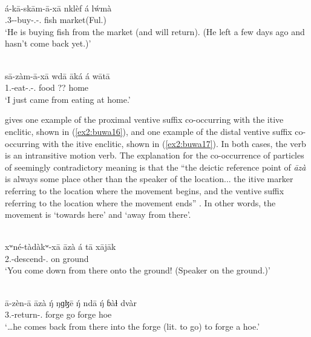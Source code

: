 \largerpage
\ea\label{ex2:buwa14}
 \\
\gll á-kā-skām-ā-xā nklèf á lẃmà	\\
.3--buy-.-. fish  market(Ful.)		\\
\glt `He is buying fish from the market (and will return). (He left a few days ago and hasn't come back yet.)'

\ex\label{ex2:buwa15}
 \\
\gll	sā-zàm-ā-xā wdā āká á wātā \\
1.-eat-.-. food ??  home \\
\glt `I just came from eating at home.'
\z 

\citet[378]{viljoenGrammaticalDescriptionBuwal2013} gives one example of the proximal ventive suffix co-occur\-ring with the itive enclitic, shown in (\ref{ex2:buwa16}), and one example of the distal ventive suffix co-occurring with the itive enclitic, shown in (\ref{ex2:buwa17}). In both cases, the verb is an intransitive motion verb. The explanation for the co-occurrence of particles of seemingly contradictory meaning is that the ``the deictic reference point of \textit{āzà} is always some place other than the speaker of the location... the itive marker referring to the location where the movement begins, and the ventive suffix referring to the location where the movement ends'' \citep[378]{viljoenGrammaticalDescriptionBuwal2013}. In other words, the movement is `towards here' and `away from there'.

\ea\label{ex2:buwa16}
 \\
\gll  xʷné-tàdàkʷ-xā āzà á tā xājāk \\
2.-descend-.   on ground \\
\glt `You come down from there onto the ground! (Speaker on the ground.)'

\ex\label{ex2:buwa17}
 \\
\gll ā-zèn-ā āzà ŋ́ ŋɡɮē ŋ́ ndā ŋ́ ɓàɬ dvàr	\\
3.-return-.   forge  go  forge hoe	\\
\glt `…he comes back from there into the forge (lit. to go) to forge a hoe.'
\z 


